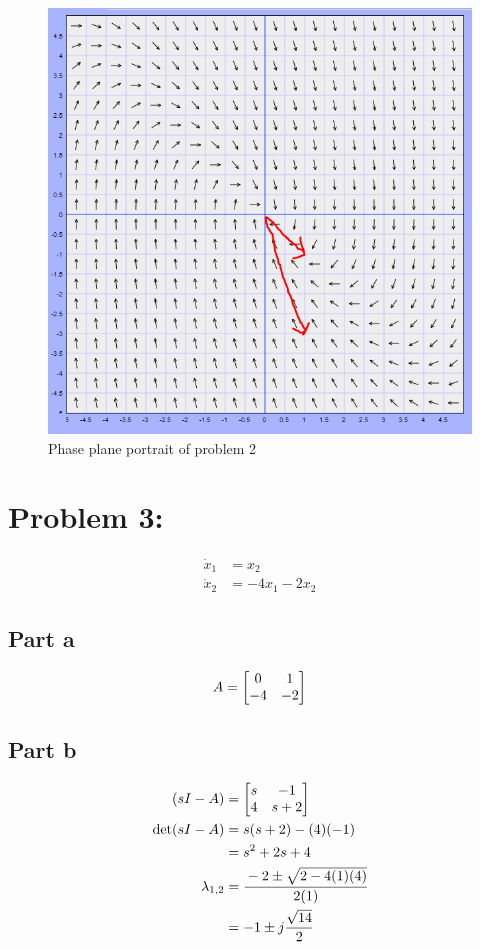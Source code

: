 \documentclass[]{article}
\begin{document}
\begin{figure}[p]
	\centering
	\includegraphics[width=0.7\linewidth]{fig/pblm2_w_vectors}
	\caption{Phase plane portrait of problem 2}
	\label{fig:pblm2}
\end{figure}


\newpage
\section{Problem 3:}
\begin{align*}
	\dot{x}_1 &= x_2\\
	\dot{x}_2 &= -4 x_1 - 2 x_2
\end{align*}

\subsection{Part a}
\begin{displaymath}
	A = \mqty[0&1\\-4&-2]
\end{displaymath}

\subsection{Part b}

\begin{align*}
	(sI - A)
	&= \mqty[s & -1\\ 4 & s+2]\\
	\det(sI-A)
	&= s(s+2) - (4)(-1)\\
	&= s^2 + 2 s + 4\\
	\lambda_{1,2}
	&= \cfrac{-2 \pm \sqrt{2 - 4(1)(4)}}{2(1)}\\
	&= -1 \pm j\frac{\sqrt{14}}{2}
\end{align*}
\end{document}
